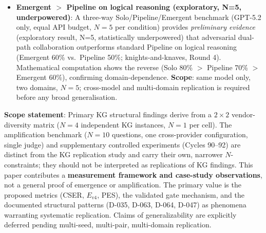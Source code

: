 \documentclass[12pt]{article}
\begin{document}
\begin{itemize}
        specified: new nodes $\to$ shorter mean span $\to$ lower $E_{v4}$).
  \item \textbf{Emergent $>$ Pipeline on logical reasoning (exploratory, N=5, underpowered)}: A three-way
        Solo/Pipeline/Emergent benchmark (GPT-5.2 only, equal API budget, $N=5$ per
        condition) provides \emph{preliminary evidence} (exploratory result, N=5, statistically underpowered) that adversarial dual-path
        collaboration outperforms standard Pipeline on logical reasoning
        (Emergent 60\% vs.\ Pipeline 50\%; knights-and-knaves, Round 4).
        Mathematical computation shows the reverse (Solo 80\% $>$ Pipeline 70\%
        $>$ Emergent 60\%), confirming domain-dependence.
        \textbf{Scope}: same model only, two domains, $N=5$; cross-model
        and multi-domain replication is required before any broad generalisation.
\end{itemize}

\noindent\textbf{Scope statement}: Primary KG structural findings derive from
a $2\times2$ vendor-diversity matrix ($N=4$ independent KG instances, $N=1$ per cell).
The amplification benchmark ($N=10$ questions, one cross-provider configuration,
single judge) and supplementary controlled experiments (Cycles 90--92) are
distinct from the KG replication study and carry their own, narrower
$N$-constraints; they should not be interpreted as replications of KG findings.
This paper contributes a \textbf{measurement framework and case-study
observations}, not a general proof of emergence or amplification.
The primary value is the proposed metrics (CSER, $E_{v4}$, PES), the validated
gate mechanism, and the documented structural patterns (D-035, D-063, D-064,
D-047) as phenomena warranting systematic replication. Claims of generalizability
are explicitly deferred pending multi-seed, multi-pair, multi-domain replication.
\end{document}

